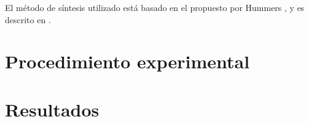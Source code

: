 El método de síntesis utilizado está basado en el propuesto por Hummers \citep{Hummers1958}, y es descrito en \citep{Abdolhosseinzadeh2015}.

\section{Procedimiento experimental}


\section{Resultados}